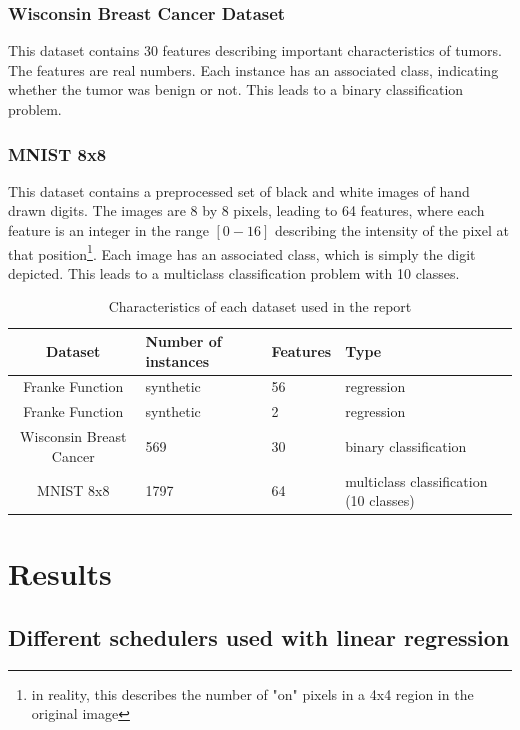 \documentclass[onecolumn,10pt,cleanfoot]{asme2ej}
\begin{document}
\subsubsection{Wisconsin Breast Cancer Dataset}

This dataset contains 30 features describing important characteristics of tumors. The features are real numbers. Each instance has an associated class, indicating whether the tumor was benign or not. This leads to a binary classification problem.

\subsubsection{MNIST 8x8}

This dataset contains a preprocessed set of black and white images of hand drawn digits. The images are 8 by 8 pixels, leading to 64 features, where each feature is an integer in the range $[0-16]$ describing the intensity of the pixel at that position\footnote{in reality, this describes the number of "on" pixels in a 4x4 region in the original image}. Each image has an associated class, which is simply the digit depicted. This leads to a multiclass classification problem with 10 classes.

\begin{table}[h]
\caption{Characteristics of each dataset used in the report}
\begin{center}
\label{datasettable}
\begin{tabular}{| c | l | l | l |}
\hline
Dataset & Number of instances & Features & Type \\
\hline
Franke Function & synthetic & 56 & regression \\
Franke Function & synthetic & 2 & regression \\
Wisconsin Breast Cancer & 569 & 30 & binary classification \\
MNIST 8x8 & 1797 & 64 & multiclass classification (10 classes) \\
\hline
\end{tabular}
\end{center}
\end{table}

\section{Results}

\subsection{Different schedulers used with linear regression}
\end{document}

